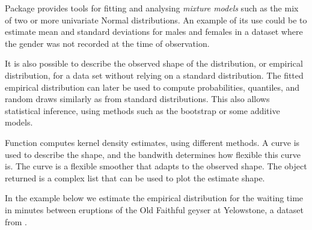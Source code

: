 \documentclass[krantz2]{krantz}\usepackage{knitr}
\begin{document}
\begin{explainbox}
Package  provides tools for fitting and analysing \emph{mixture models} such as the mix of two or more univariate Normal distributions. An example of its use could be to estimate mean and standard deviations for males and females in a dataset where the gender was not recorded at the time of observation.
\end{explainbox}

It is also possible to describe the observed shape of the distribution, or empirical distribution, for a data set without relying on a standard distribution. The fitted empirical distribution can later be used to compute probabilities, quantiles, and random draws similarly as from standard distributions. This also allows statistical inference, using methods such as the bootstrap or some additive models.

Function  computes kernel density estimates, using different methods. A curve is used to describe the shape, and the bandwith determines how flexible this curve is. The curve is a flexible smoother that adapts to the observed shape. The object returned is a complex list that can be used to plot the estimate shape.

In the example below we estimate the empirical distribution for the waiting time in minutes between eruptions of the Old Faithful geyser at Yelowstone, a dataset from \Rlang.

\begin{knitrout}\footnotesize
{}\color{fgcolor}\begin{kframe}
\begin{alltt}
 \hlkwb{<-} \hlopt{$}  \hlstd{=} \hlstd{)}
\end{alltt}
\end{kframe}
\end{knitrout}
\end{document}
